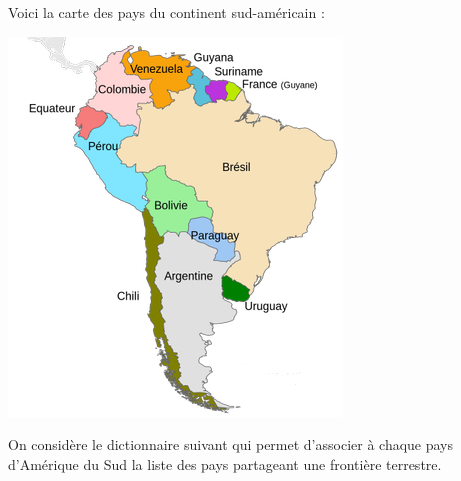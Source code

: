 \documentclass[
  a4paper,
  DIV=11,
  numbers=noendperiod]{scrartcl}
\begin{document}
Voici la carte des pays du continent sud-américain :

\includegraphics{a2_carte_amerique_sud_pays.png}

On considère le dictionnaire suivant qui permet d'associer à chaque pays
d'Amérique du Sud la liste des pays partageant une frontière terrestre.
\end{document}
